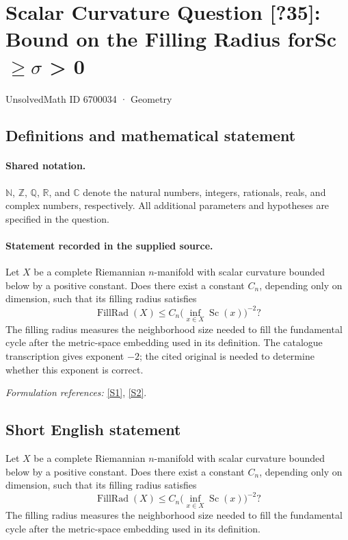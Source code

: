 \documentclass[11pt]{article}
\newcommand{\sref}[2]{\hyperlink{source:#1:#2}{[S#2]}}
\begin{document}
\setcounter{section}{6700033}
\section{\texorpdfstring{Scalar Curvature Question [?35]: Bound on the Filling Radius forSc $\geq\sigma$ > 0}{Scalar Curvature Question [?35]: Bound on the Filling Radius forSc ≥σ > 0}}\label{6700034}
{\small UnsolvedMath ID 6700034 · Geometry}
\subsection{Definitions and mathematical statement}

\paragraph{Shared notation.}$\mathbb N$, $\mathbb Z$, $\mathbb Q$, $\mathbb R$, and $\mathbb C$ denote the natural numbers, integers, rationals, reals, and complex numbers, respectively. All additional parameters and hypotheses are specified in the question.


\paragraph{Statement recorded in the supplied source.}
Let $X$ be a complete Riemannian $n$-manifold with scalar curvature bounded below by a positive constant. Does there exist a constant $C_n$, depending only on dimension, such that its filling radius satisfies
\[\operatorname{FillRad}(X)\leq C_n\bigl(\inf_{x\in X}\operatorname{Sc}(x)\bigr)^{-2}?\]
The filling radius measures the neighborhood size needed to fill the fundamental cycle after the metric-space embedding used in its definition.
The catalogue transcription gives exponent $-2$; the cited original is needed to determine whether this exponent is correct.
\par\smallskip\textit{Formulation references:} \sref{6700034}{1}, \sref{6700034}{2}.
\subsection{Short English statement}
Let $X$ be a complete Riemannian $n$-manifold with scalar curvature bounded below by a positive constant. Does there exist a constant $C_n$, depending only on dimension, such that its filling radius satisfies
\[\operatorname{FillRad}(X)\leq C_n\bigl(\inf_{x\in X}\operatorname{Sc}(x)\bigr)^{-2}?\]
The filling radius measures the neighborhood size needed to fill the fundamental cycle after the metric-space embedding used in its definition.
\end{document}
